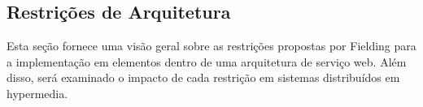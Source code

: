 \subsection[Restrições de Arquitetura]{Restrições de Arquitetura}

Esta seção fornece uma visão geral sobre as restrições propostas por Fielding para a implementação em elementos dentro de uma arquitetura de serviço web. Além disso, será examinado o impacto de cada restrição em sistemas distribuídos em hypermedia.








